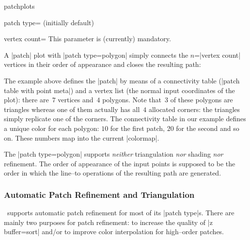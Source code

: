 \begin{pgfplotslibrary}{patchplots}
\begin{pgfplotskey}{patch type= (initially default)}
\begin{pgfplotskey}{vertex count=}
		This parameter is (currently) mandatory.
	\end{pgfplotskey}
	A |patch| plot with |patch type=polygon| simply connects the $n$=|vertex count| vertices in their order of appearance and closes the resulting path:
\begin{codeexample}[]
\end{codeexample}
	\noindent The example above defines the |patch| by means of a connectivity table (|patch table with point meta|) and a vertex list (the normal input coordinates of the plot): there are~$7$ vertices and~$4$ polygons. Note that~$3$ of these polygons are triangles whereas one of them actually has all~$4$ allocated corners: the triangles simply replicate one of the corners. The connectivity table in our example defines a unique color for each polygon: $10$ for the first patch, $20$ for the second and so on. These numbers map into the current |colormap|.
	
	The |patch type=polygon| supports \emph{neither} triangulation \emph{nor} shading \emph{nor} refinement. The order of appearance of the input points is supposed to be the order in which the line--to operations of the resulting path are generated.

\end{pgfplotskey}



\subsubsection{Automatic Patch Refinement and Triangulation}
\PGFPlots\ supports automatic patch refinement for most of its |patch type|s. There are mainly two purposes for patch refinement: to increase the quality of |z buffer=sort| and/or to improve color interpolation for high--order patches. 


\end{pgfplotslibrary}
